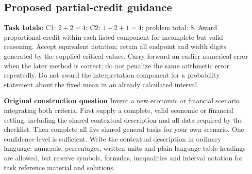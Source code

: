 \secInicio[][sec:p2]

\clearpage

\subsection*{Proposed partial-credit guidance}
\textbf{Task totals:} C1: $2+2=4$; C2: $1+2+1=4$; problem total: 8. Award proportional credit within each listed component for incomplete but valid reasoning. Accept equivalent notation; retain all endpoint and width digits generated by the supplied critical values. Carry forward an earlier numerical error when the later method is correct; do not penalize the same arithmetic error repeatedly. Do not award the interpretation component for a probability statement about the fixed mean in an already calculated interval.


\secInicio[][sec:p2]

\clearpage


\textbf{Original construction question}
Invent a new economic or financial scenario integrating both criteria. First supply a complete, valid economic or financial setting, including the shared contextual description and all data required by the checklist. Then complete all five shared general tasks for your own scenario. One confidence level is sufficient. Write the contextual description in ordinary language: numerals, percentages, written units and plain-language table headings are allowed, but reserve symbols, formulas, inequalities and interval notation for task reference material and solutions.


